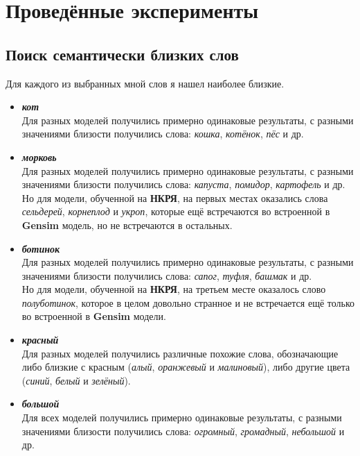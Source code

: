 \documentclass[oneside,final,12pt]{article}
\begin{document}
\section{Проведённые эксперименты}

\subsection{Поиск семантически близких слов}

Для каждого из выбранных мной слов я нашел наиболее близкие.

\begin{itemize}
	\item {\textbf{\textit{кот}}\\
		Для разных моделей получились примерно одинаковые результаты, с разными значениями близости получились слова: \textit{кошка}, \textit{котёнок}, \textit{пёс} и др. }
	\item {\textbf{\textit{морковь}}\\
		Для разных моделей получились примерно одинаковые результаты, с разными значениями близости получились слова: \textit{капуста}, \textit{помидор}, \textit{картофель} и др.\\
		Но для модели, обученной на \textbf{НКРЯ}, на первых местах оказались слова \textit{сельдерей}, \textit{корнеплод} и \textit{укроп}, которые ещё встречаются во встроенной в \textbf{Gensim} модель, но не встречаются в остальных. }
	\item {\textbf{\textit{ботинок}}\\
		Для разных моделей получились примерно одинаковые результаты, с разными значениями близости получились слова: \textit{сапог}, \textit{туфля}, \textit{башмак} и др.\\
		Но для модели, обученной на \textbf{НКРЯ}, на третьем месте оказалось слово \textit{полуботинок}, которое в целом довольно странное и не встречается ещё только во встроенной в \textbf{Gensim} модели. }
	\item {\textbf{\textit{красный}}\\
		Для разных моделей получились различные похожие слова, обозначающие либо близкие с красным (\textit{алый}, \textit{оранжевый} и \textit{малиновый}), либо другие цвета (\textit{синий}, \textit{белый} и \textit{зелёный}). }
	\item {\textbf{\textit{большой}}\\
		Для всех моделей получились примерно одинаковые результаты, с разными значениями близости получились слова: \textit{огромный}, \textit{громадный}, \textit{небольшой} и др. }

\end{itemize}
\end{document}
